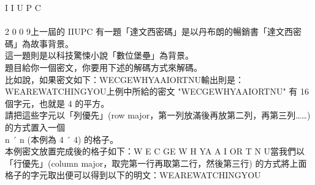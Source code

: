 I I U P C\\
\\
 2 0 0 9上一屆的 IIUPC 有一題「達文西密碼」是以丹布朗的暢銷書「達文西密碼」為故事背景。\\
這一題則是以科技驚悚小說「數位堡壘」為背景。\\
題目給你一個密文，你要用下述的解碼方式來解碼。\\
比如說，如果密文如下：WECGEWHYAAIORTNU輸出則是：WEAREWATCHINGYOU上例中所給的密文 "WECGEWHYAAIORTNU" 有 16 個字元，也就是 4 的平方。\\
請把這些字元以「列優先」(row major，第一列放滿後再放第二列，再第三列……) 的方式置入一個\\
n ´ n (本例為 4 ´ 4) 的格子。\\
本例密文放置完成後的格子如下：W E C GE W H YA A I OR T N U當我們以「行優先」(column major，取完第一行再取第二行，然後第三行) 的方式將上面格子的字元取出便可以得到以下的明文：WEAREWATCHINGYOU